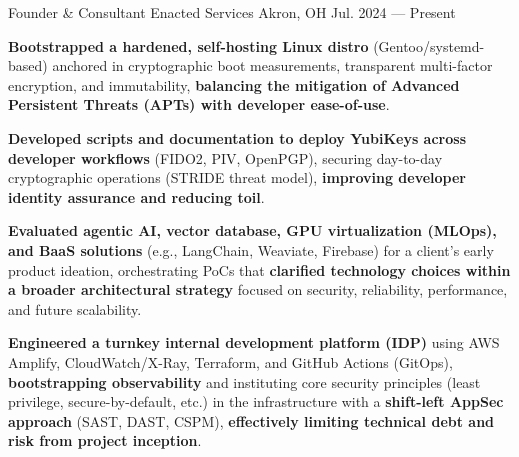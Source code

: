 \begin{cventries}
    \cventry
        { Founder \& Consultant }
        { Enacted Services }
        { Akron, OH }
        { Jul. 2024 --- Present }
        {
            \begin{cvitems}
                \item{\textbf{Bootstrapped a hardened, self-hosting Linux distro} (Gentoo/systemd-based) anchored in cryptographic boot measurements, transparent multi-factor encryption, and immutability, \textbf{balancing the mitigation of Advanced Persistent Threats (APTs) with developer ease-of-use}.}
                \item{\textbf{Developed scripts and documentation to deploy YubiKeys across developer workflows} (FIDO2, PIV, OpenPGP), securing day-to-day cryptographic operations (STRIDE threat model), \textbf{improving developer identity assurance and reducing toil}.}
                \item{\textbf{Evaluated agentic AI, vector database, GPU virtualization (MLOps), and BaaS solutions} (e.g., LangChain, Weaviate, Firebase) for a client's early product ideation, orchestrating PoCs that \textbf{ clarified technology choices within a broader architectural strategy} focused on security, reliability, performance, and future scalability.}
                \item{\textbf{Engineered a turnkey internal development platform (IDP)} using AWS Amplify, CloudWatch/X-Ray, Terraform, and GitHub Actions (GitOps), \textbf{bootstrapping observability} and instituting core security principles (least privilege, secure-by-default, etc.) in the infrastructure with a \textbf{shift-left AppSec approach} (SAST, DAST, CSPM), \textbf{effectively limiting technical debt and risk from project inception}.}
            \end{cvitems}
        }
\end{cventries}
